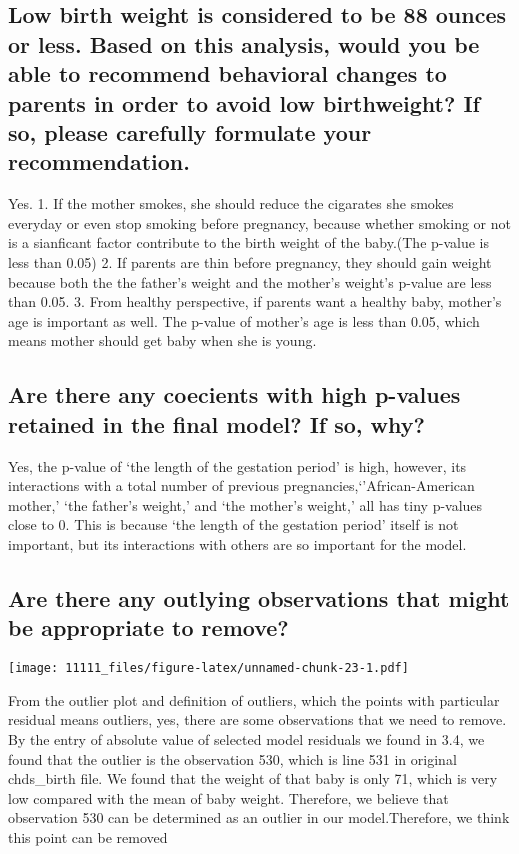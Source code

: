 \documentclass[]{article}
\begin{document}
\subsection{Low birth weight is considered to be 88 ounces or less. Based on this analysis, would you be able to recommend behavioral changes to parents in order to avoid low birthweight? If so, please carefully formulate your recommendation.}

Yes. 1. If the mother smokes, she should reduce the cigarates she smokes
everyday or even stop smoking before pregnancy, because whether smoking
or not is a sianficant factor contribute to the birth weight of the
baby.(The p-value is less than 0.05) 2. If parents are thin before
pregnancy, they should gain weight because both the the father's weight
and the mother's weight's p-value are less than 0.05. 3. From healthy
perspective, if parents want a healthy baby, mother's age is important
as well. The p-value of mother's age is less than 0.05, which means
mother should get baby when she is young.
\subsection{Are there any coecients with high p-values retained in the final model? If so, why?}
Yes, the p-value of `the length of the gestation period' is high,
however, its interactions with a total number of previous
pregnancies,`'African-American mother,' `the father's weight,' and `the
mother's weight,' all has tiny p-values close to 0. This is because `the
length of the gestation period' itself is not important, but its
interactions with others are so important for the model.

\subsection{Are there any outlying observations that might be appropriate to remove?}

\texttt{[image: 11111\_files/figure-latex/unnamed-chunk-23-1.pdf]}

From the outlier plot and definition of outliers, which the points with
particular residual means outliers, yes, there are some observations
that we need to remove. By the entry of absolute value of selected model
residuals we found in 3.4, we found that the outlier is the observation
530, which is line 531 in original chds\_birth file. We found that the
weight of that baby is only 71, which is very low compared with the mean
of baby weight. Therefore, we believe that observation 530 can be
determined as an outlier in our model.Therefore, we think this point can
be removed
\end{document}

